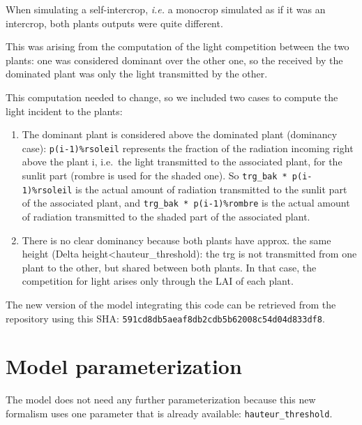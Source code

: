 \documentclass[]{book}
\begin{document}
When simulating a self-intercrop, \emph{i.e.} a monocrop simulated as if it was an intercrop, both plants outputs were quite different.

This was arising from the computation of the light competition between the two plants: one was considered dominant over the other one, so the received by the dominated plant was only the light transmitted by the other.

This computation needed to change, so we included two cases to compute the light incident to the plants:

\begin{enumerate}
\def\labelenumi{\arabic{enumi}.}
\item
  The dominant plant is considered above the dominated plant (dominancy case): \texttt{p(i-1)\%rsoleil} represents the fraction of the radiation incoming right above the plant i, i.e.~the light transmitted to the associated plant, for the sunlit part (rombre is used for the shaded one). So \texttt{trg\_bak\ *\ p(i-1)\%rsoleil} is the actual amount of radiation transmitted to the sunlit part of the associated plant, and \texttt{trg\_bak\ *\ p(i-1)\%rombre} is the actual amount of radiation transmitted to the shaded part of the associated plant.
\item
  There is no clear dominancy because both plants have approx. the same height (Delta height\textless{}hauteur\_threshold): the trg is not transmitted from one plant to the other, but shared between both plants. In that case, the competition for light arises only through the LAI of each plant.
\end{enumerate}

The new version of the model integrating this code can be retrieved from the repository using this SHA: \texttt{591cd8db5aeaf8db2cdb5b62008c54d04d833df8}.

\hypertarget{model-parameterization-1}{%
\section{Model parameterization}\label{model-parameterization-1}}

The model does not need any further parameterization because this new formalism uses one parameter that is already available: \texttt{hauteur\_threshold}.


\end{document}
